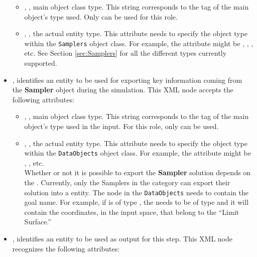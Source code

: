 \begin{itemize}
\begin{itemize}
  \item {}, , main object class
    type.
    This string corresponds to the tag of the main object's type used.
    Only  can be used for this role.
  \item {}, , the actual entity
    type.
    This attribute needs to specify the object type within the \texttt{Samplers}
    object class.
    For example, the  attribute might be ,
   , , etc.
    See Section \ref{sec:Samplers} for all the different types currently
    supported.
\end{itemize}
\item {},  identifies
an entity to be used for exporting key information coming from the
\textbf{Sampler} object during the simulation.
This XML node accepts the following attributes:
\begin{itemize}
  \item {}, , main object class
    type.
    This string corresponds to the tag of the main object's type used in the
    input.
    For this role, only  can be used.
  \item {}, , the actual entity
    type.
    This attribute needs to specify the object type within the \texttt{DataObjects} 
    object class.
    For example, the  attribute might be , 
    , etc. \\
    \nb Whether or not it is possible to export the \textbf{Sampler} solution
    depends on the .
    Currently, only the Samplers in the  category can
    export their solution into a  entity. The  node 
    in the \texttt{DataObjects} needs to contain the goal   name. 
    For example, if   is of type , the 
     needs to be of type  and 
    it will contain the coordinates, in the input space, that belong to the
    ``Limit Surface.'' 
\end{itemize}
\item {},  identifies an
entity to be used as output for this step.
This XML node recognizes the following attributes:

\end{itemize}
